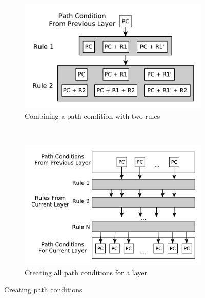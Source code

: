 \begin{figure}[htb]
\centering
        \begin{subfigure}[b]{0.480\textwidth}
                \centering
                \includegraphics[width=1\textwidth]{./figures/overview/layers_pc.pdf}
                 \caption{Combining a path condition with two rules}
                 \label{fig:layers_pc}
        \end{subfigure}%
        ~~
        \begin{subfigure}[b]{0.48\textwidth}
                        \centering
                        
             \includegraphics[width=1\textwidth]{./figures/overview/all_pcs.pdf}
             \caption{Creating all path conditions for a layer}
             \label{fig:all_pcs}
	    \end{subfigure}%
           \caption{Creating path conditions}
         \label{fig:creating_pcs}
\end{figure}


